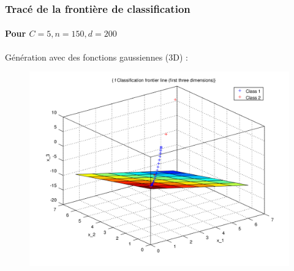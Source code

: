 \documentclass{beamer}
\begin{document}
\begin{frame}
\frametitle{Tracé de la frontière de classification}
\framesubtitle{Pour $C = 5, n = 150, d = 200$}

Génération avec des fonctions gaussiennes (3D) :

         \begin{figure}
         \centering
         \includegraphics[scale=0.4]{images/plane5.png}
         \end{figure}

\end{frame}





\end{document}

